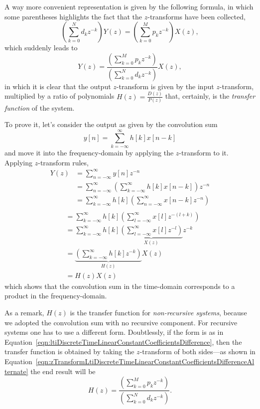 \documentclass[\documentfontsize, twocolumn]{\classname}
\begin{document}
A way more convenient representation is given by the following formula, in which some parentheses highlights the fact that the $z$-transforms have been collected,
\[
    \left(\sum_{k=0}^N d_k z^{-k}\right) Y(z) = \left(\sum_{k=0}^M p_k z^{-k}\right) X(z),
\]
which suddenly leads to
\begin{equation}\label{eqn:zTransformLtiDiscreteTimeLinearConstantCoefficientsDifferenceAlternate}
    Y(z) = \frac {
        \left(\sum_{k=0}^M p_k z^{-k}\right)
    } {
        \left(\sum_{k=0}^N d_k z^{-k}\right)
    } X(z),
\end{equation}
in which it is clear that the output $z$-transform is given by the input $z$-transform, multiplied by a ratio of polynomials $H(z) = \frac{D(z)}{P(z)}$ that, certainly, is the \emph{transfer function} of the system.

To prove it, let's consider the output as given by the convolution sum
\[
    y[n] = \sum_{k=-\infty}^\infty h[k] x[n-k]
\]
and move it into the frequency-domain by applying the $z$-transform to it. Applying $z$-transform rules,
\begin{align*}
    Y(z) 
    &= \sum_{n=-\infty}^\infty y[n]z^{-n} \\
    &= \sum_{n=-\infty}^\infty \left(\sum_{k=-\infty}^\infty h[k] x[n-k]\right)z^{-n}\\
    &= \sum_{k=-\infty}^\infty h[k] \left(\sum_{n=-\infty}^\infty x[n-k]z^{-n}\right)\\
\end{align*}
\begin{align*}
    &= \sum_{k=-\infty}^\infty h[k] \left(\sum_{l=-\infty}^\infty x[l]z^{-(l+k)}\right)\\
    &= \sum_{k=-\infty}^\infty h[k] \underbrace{\left(\sum_{l=-\infty}^\infty x[l]z^{-l}\right)}_{X(z)}z^{-k}\\
    &= \underbrace{\left(\sum_{k=-\infty}^\infty h[k]z^{-k}\right)}_{H(z)} X(z)\\
    &= H(z)X(z)
\end{align*}
which shows that the convolution sum in the time-domain corresponds to a product in the frequency-domain. 

As a remark, $H(z)$ is the transfer function for \emph{non-recursive systems}, because we adopted the convolution sum with no recursive component. For recursive systems one has to use a different form. Doubtlessly, if the form is as in Equation~\ref{eqn:ltiDiscreteTimeLinearConstantCoefficientsDifference}, then the transfer function is obtained by taking the $z$-transform of both sides---as shown in Equation~\ref{eqn:zTransformLtiDiscreteTimeLinearConstantCoefficientsDifferenceAlternate} the end result will be
\begin{equation}\label{eqn:transferFunctionRecursiveSystems}
    H(z) = \frac {
        \left(\sum_{k=0}^M p_k z^{-k}\right)
    } {
        \left(\sum_{k=0}^N d_k z^{-k}\right)
    }.
\end{equation}
\end{document}
